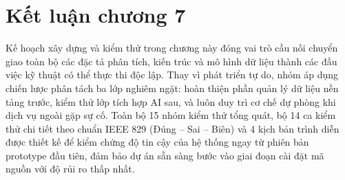 \section{Kết luận chương 7}\label{sec:v8-conclusion-ch7}

Kế hoạch xây dựng và kiểm thử trong chương này đóng vai trò cầu nối chuyển giao toàn bộ các đặc tả phân tích, kiến trúc và mô hình dữ liệu thành các đầu việc kỹ thuật có thể thực thi độc lập. Thay vì phát triển tự do, nhóm áp dụng chiến lược phân tách ba lớp nghiêm ngặt: hoàn thiện phần quản lý dữ liệu nền tảng trước, kiểm thử lớp tích hợp AI sau, và luôn duy trì cơ chế dự phòng khi dịch vụ ngoài gặp sự cố. Toàn bộ 15 nhóm kiểm thử tổng quát, bộ 14 ca kiểm thử chi tiết theo chuẩn IEEE 829 (Đúng -- Sai -- Biên) và 4 kịch bản trình diễn được thiết kế để kiểm chứng độ tin cậy của hệ thống ngay từ phiên bản prototype đầu tiên, đảm bảo dự án sẵn sàng bước vào giai đoạn cài đặt mã nguồn với độ rủi ro thấp nhất.

